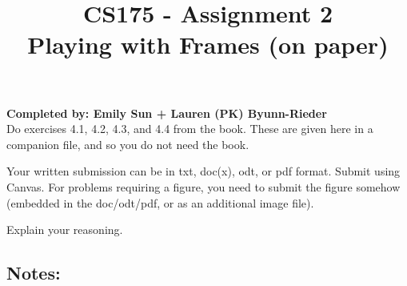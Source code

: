 \documentclass[letterpaper, 11pt]{article}
\title{CS175 - Assignment 2 \\Playing with Frames (on paper)}
\date{}
\begin{document}
\maketitle

\textbf{Completed by: Emily Sun + Lauren (PK) Byunn-Rieder}\\


Do exercises 4.1, 4.2, 4.3, and 4.4 from the book. These are given here
in a companion file, and so you do not need the book.

Your written submission can be in txt, doc(x), odt, or pdf format. Submit using Canvas. For problems requiring
a figure, you need to submit the figure somehow (embedded in the
doc/odt/pdf, or as an additional image file).

Explain your reasoning.

\subsection*{Notes:}
\end{document}

